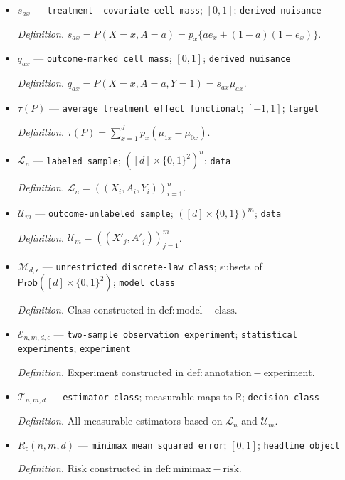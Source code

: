 \documentclass{article}
\begin{document}
\begin{itemize}
  \item \(s_{ax}\) --- \texttt{treatment-\allowbreak{}-\allowbreak{}covariate cell mass}; \([0,1]\); \texttt{derived nuisance}
  \par\smallskip\noindent\emph{Definition.} \(s_{ax}=P(X=x,A=a)=p_x\{a e_x+(1-a)(1-e_x)\}\).
  \item \(q_{ax}\) --- \texttt{outcome-\allowbreak{}marked cell mass}; \([0,1]\); \texttt{derived nuisance}
  \par\smallskip\noindent\emph{Definition.} \(q_{ax}=P(X=x,A=a,Y=1)=s_{ax}\mu_{ax}\).
  \item \(\tau(P)\) --- \texttt{average treatment effect functional}; \([-1,1]\); \texttt{target}
  \par\smallskip\noindent\emph{Definition.} \(\tau(P)=\sum_{x=1}^{d}p_x(\mu_{1x}-\mu_{0x})\).
  \item \(\mathcal L_n\) --- \texttt{labeled sample}; \(([d]\times\{0,1\}^2)^n\); \texttt{data}
  \par\smallskip\noindent\emph{Definition.} \(\mathcal L_n=((X_i,A_i,Y_i))_{i=1}^{n}\).
  \item \(\mathcal U_m\) --- \texttt{outcome-\allowbreak{}unlabeled sample}; \(([d]\times\{0,1\})^m\); \texttt{data}
  \par\smallskip\noindent\emph{Definition.} \(\mathcal U_m=((X'_j,A'_j))_{j=1}^{m}\).
  \item \(\mathcal M_{d,\epsilon}\) --- \texttt{unrestricted discrete-\allowbreak{}law class}; subsets of \(\mathsf{Prob}([d]\times\{0,1\}^2)\); \texttt{model class}
  \par\smallskip\noindent\emph{Definition.} Class constructed in \(\mathrm{def:model-class}\).
  \item \(\mathcal E_{n,m,d,\epsilon}\) --- \texttt{two-\allowbreak{}sample observation experiment}; \texttt{statistical experiments}; \texttt{experiment}
  \par\smallskip\noindent\emph{Definition.} Experiment constructed in \(\mathrm{def:annotation-experiment}\).
  \item \(\mathcal T_{n,m,d}\) --- \texttt{estimator class}; measurable maps to \(\mathbb R\); \texttt{decision class}
  \par\smallskip\noindent\emph{Definition.} All measurable estimators based on \(\mathcal L_n\) and \(\mathcal U_m\).
  \item \(R_\epsilon(n,m,d)\) --- \texttt{minimax mean squared error}; \([0,1]\); \texttt{headline object}
  \par\smallskip\noindent\emph{Definition.} Risk constructed in \(\mathrm{def:minimax-risk}\).

\end{itemize}
\end{document}
